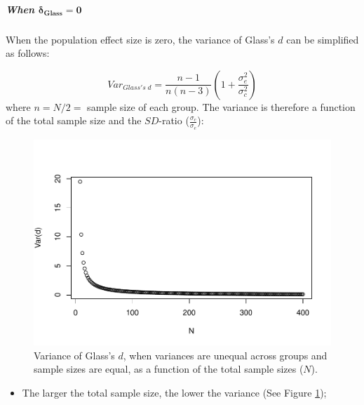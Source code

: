 \documentclass[
  english,
  man,mask]{apa6}
\providecommand{\tightlist}{%
  \setlength{\itemsep}{0pt}\setlength{\parskip}{0pt}}
\let\oldsubparagraph\subparagraph
\renewcommand{\subparagraph}[1]{\oldsubparagraph{#1}\mbox{}}
\begin{document}
\hypertarget{when-bmdelta_glass-0}{%
\subparagraph{\texorpdfstring{When \(\bm{\delta_{Glass} = 0}\)}{When \textbackslash bm\{\textbackslash delta\_\{Glass\} = 0\}}}\label{when-bmdelta_glass-0}}

When the population effect size is zero, the variance of Glass's \(d\) can be simplified as follows:

\[Var_{Glass's \; d} = \frac{n-1}{n(n-3)} \left( 1+\frac{\sigma^2_e}{\sigma^2_c}\right)\]
where \(n=N/2=\) sample size of each group. The variance is therefore a function of the total sample size and the \(SD\)-ratio (\(\frac{\sigma_c}{\sigma_e}\)):

\begin{figure}
\centering
\includegraphics{Theoretical-Bias-of-all-estimators-as-a-function-of-population-parameters_files/figure-latex/varglassHetbalNsize2-1.pdf}
\caption{\label{fig:varglassHetbalNsize2}Variance of Glass's \(d\), when variances are unequal across groups and sample sizes are equal, as a function of the total sample sizes (\(N\)).}
\end{figure}

\begin{itemize}
\tightlist
\item
  The larger the total sample size, the lower the variance (See Figure \ref{fig:varglassHetbalNsize2});
\end{itemize}
\end{document}
